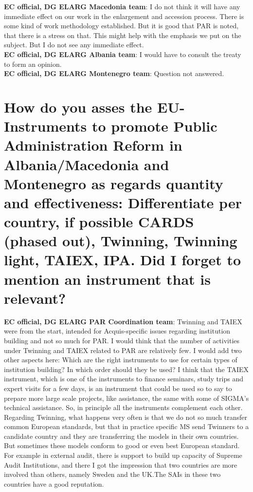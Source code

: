 \textbf{EC official, DG ELARG Macedonia team}: I do not think it will have any immediate effect on our work in the enlargement and accession process. There is some kind of work methodology established. But it is good that PAR is noted, that there is a stress on that. This might help with the emphasis we put on the subject. But I do not see any immediate effect. \\
\textbf{EC official, DG ELARG Albania team}: I would have to consult the treaty to form an opinion. \\
\textbf{EC official, DG ELARG Montenegro team}: Question not answered.\\
\section{How do you asses the EU-Instruments to promote Public Administration Reform in
Albania/Macedonia and Montenegro as regards quantity and effectiveness: Differentiate per country, if possible CARDS (phased out), Twinning, Twinning light, TAIEX, IPA. Did I forget to mention an instrument that is relevant? }
\label{sec:relevant}
\textbf{EC official, DG ELARG PAR Coordination team}: Twinning and TAIEX were from the start, intended for Acquis-specific issues regarding institution building and not so much for PAR. I would think that the number of activities under Twinning and TAIEX related to PAR are relatively few. I would add two other aspects here: Which are the right instruments to use for certain types of institution building? In which order should they be used? I think that the TAIEX instrument, which is one of the instruments to finance seminars, study trips and expert visits for a few days, is an instrument that could be used so to say to prepare more large scale projects, like assistance, the same with some of SIGMA's technical assistance. So, in principle all the instruments complement each other. Regarding Twinning, what happens very often is that we do not so much transfer common European standards, but that in practice specific MS send Twinners to a candidate country and they are transferring the models in their own countries. But sometimes these models conform to good or even best European standard. For example in external audit, there is support to build up capacity of Supreme Audit Institutions, and there I got the impression that two countries are more involved than others, namely Sweden and the UK.The SAIs in these two countries have a  good reputation.\\

